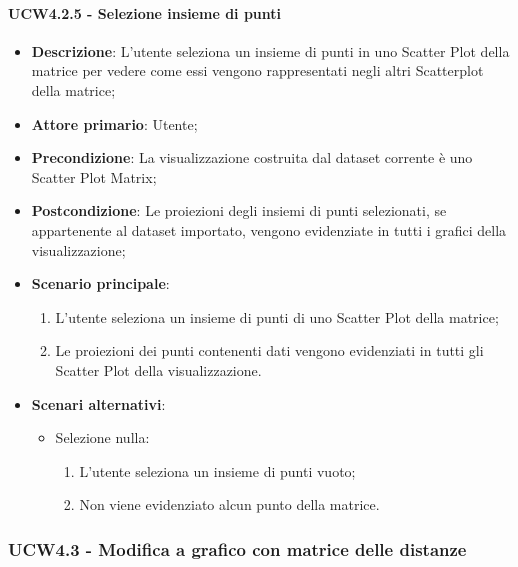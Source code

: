 \paragraph{UCW4.2.5 - Selezione insieme di punti}
\label{par:ucw4.2.5}
\begin{itemize}
    \item \textbf{Descrizione}: L'utente seleziona un insieme di punti in uno Scatter Plot della matrice per vedere come
                                essi vengono rappresentati negli altri Scatterplot della matrice;

    \item \textbf{Attore primario}: Utente;

    \item \textbf{Precondizione}:   La visualizzazione costruita dal dataset corrente è uno Scatter Plot Matrix;
    \item \textbf{Postcondizione}:  Le proiezioni degli insiemi di punti selezionati, se appartenente al dataset importato,
                                    vengono evidenziate in tutti i grafici della visualizzazione;

	\item \textbf{Scenario principale}:
        \begin{enumerate}
            \item L'utente seleziona un insieme di punti di uno Scatter Plot della matrice;
            \item Le proiezioni dei punti contenenti dati vengono evidenziati in tutti gli Scatter Plot della visualizzazione.
        \end{enumerate}

    \item \textbf{Scenari alternativi}:
    \begin{itemize}
        \item Selezione nulla:
        \begin{enumerate}
            \item L'utente seleziona un insieme di punti vuoto;
            \item Non viene evidenziato alcun punto della matrice.
        \end{enumerate}
    \end{itemize}    

\end{itemize}

\newpage
\subsubsection{UCW4.3 - Modifica a grafico con matrice delle distanze}
\label{ssub:ucw4.3}

